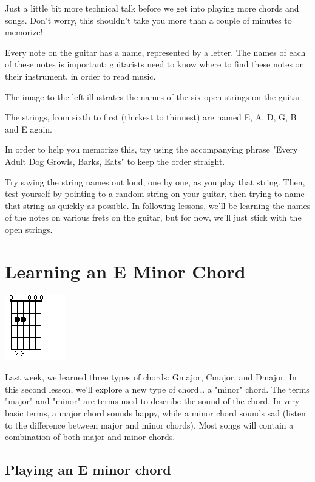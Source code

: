 Just a little bit more technical talk before we get into playing more chords
and songs. Don't worry, this shouldn't take you more than a couple of minutes
to memorize!

Every note on the guitar has a name, represented by a letter. The names of each
of these notes is important; guitarists need to know where to find these notes
on their instrument, in order to read music.

The image to the left illustrates the names of the six open strings on the guitar.

The strings, from sixth to first (thickest to thinnest) are named E, A, D, G, B
and E again.

In order to help you memorize this, try using the accompanying phrase "Every
Adult Dog Growls, Barks, Eats" to keep the order straight.

Try saying the string names out loud, one by one, as you play that string.
Then, test yourself by pointing to a random string on your guitar, then trying
to name that string as quickly as possible. In following lessons, we'll be
learning the names of the notes on various frets on the guitar, but for now,
we'll just stick with the open strings.

\section{Learning an E Minor Chord}
\includegraphics{parttwo/openeminor.png}

Last week, we learned three types of chords: Gmajor, Cmajor, and Dmajor. In
this second lesson, we'll explore a new type of chord\ldots{} a "minor" chord. The
terms "major" and "minor" are terms used to describe the sound of the chord. In
very basic terms, a major chord sounds happy, while a minor chord sounds sad
(listen to the difference between major and minor chords). Most songs will
contain a combination of both major and minor chords.

\subsection{Playing an E minor chord}

